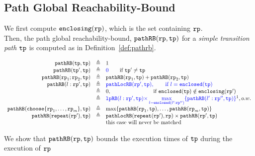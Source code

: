 \subsection{Path Global Reachability-Bound}
\label{sec:pathrb}
We first compute $\mathtt{enclosing}(\mathtt{rp})$, which is the set containing  $\mathtt{rp}$.
\\
Then, the path global reachability-bound, $\mathtt{pathRB}(\mathtt{rp}, \mathtt{tp})$ for a \emph{simple transition path} $\mathtt{tp}$ is computed as in Definition~\ref{def:pathrb}.
%
\begin{defn}
  \label{def:pathrb}
\[
  \begin{array}{rcl}
    \inoutB(\tpath, \tpath) & \triangleq & 1  \\
    \inoutB(\tpath', \tpath) & \triangleq & \highlight{0} \qquad \text{if } \tpath' \neq \tpath\\
    \inoutB(\rprog_1;\rprog_2, \tpath) & \triangleq & \inoutB(\rprog_1, \tpath) + \inoutB(\rprog_2, \tpath) \\
    \inoutB(l: \rprog', \tpath) & \triangleq & 
    \highlight{\outinB(\rprog', \tpath), \qquad \text{if } l = \kw{enclosed}(\tpath)}
    \\
    &  \triangleq & 
   0, \qquad \qquad \qquad \quad ~~ \text{if }  \kw{enclosed}(\tpath) \notin \kw{enclosing}(\rprog')
    \\
    &  \triangleq & 
    \highlight{
      \lpchB(l:\rprog', \tpath ) }
    \highlight{\times \max\limits_{l = \kw{enclosed}(l':\rprog'')}
   \{\inoutB(l':\rprog'', \tpath)\} } \footnotemark, o.w. \\
    \inoutB(\rpchoose{\rprog_1, \ldots, \rprog_m }, \tpath) & \triangleq 
    & \max\left\{ \inoutB(\rprog_1, \tpath), \ldots, \inoutB(\rprog_m, \tpath) \right\} 
    \\
    \inoutB(\rprepeat(\rprog'), \tpath) & \triangleq & \outinB(\rprepeat(\rprog'), \rprog) \times \inoutB(\rprog', \tpath)\\
    &  & \text{this case will never be matched}
    \end{array}
  \]
  \end{defn}
%
We show that $\mathtt{pathRB}(\mathtt{rp}, \mathtt{tp})$ bounds the execution times of $\mathtt{tp}$ during the execution of $\mathtt{rp}$


